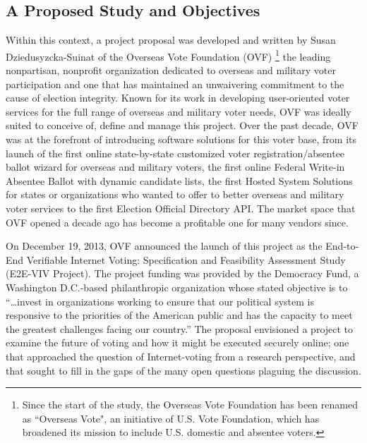\subsection{A Proposed Study and Objectives}
\label{sec:proposed-study-and-objectives}

Within this context, a project proposal was developed and written by
Susan Dziedusyzcka-Suinat of the Overseas Vote Foundation (OVF)
\footnote{Since the start of the study, the Overseas Vote Foundation
  has been renamed as ``Overseas Vote", an initiative of U.S. Vote
  Foundation, which has broadened its mission to include U.S. domestic
  and absentee voters.}  the leading nonpartisan, nonprofit
organization dedicated to overseas and military voter participation
and one that has maintained an unwaivering commitment to the cause of
election integrity. Known for its work in developing user-oriented
voter services for the full range of overseas and military voter
needs, OVF was ideally suited to conceive of, define and manage this
project. Over the past decade, OVF was at the forefront of introducing
software solutions for this voter base, from its launch of the first
online state-by-state customized voter registration/absentee ballot
wizard for overseas and military voters, the first online Federal
Write-in Absentee Ballot with dynamic candidate lists, the first
Hosted System Solutions for states or organizations who wanted to
offer to better overseas and military voter services to the first
Election Official Directory API. The market space that OVF opened a
decade ago has become a profitable one for many vendors since.

On December 19, 2013, OVF announced the launch of this project as the
End-to-End Verifiable Internet Voting: Specification and Feasibility
Assessment Study (E2E-VIV Project). The project funding was provided
by the Democracy Fund, a Washington D.C.-based philanthropic
organization whose stated objective is to ``\ldots{}invest in
organizations working to ensure that our political system is
responsive to the priorities of the American public and has the
capacity to meet the greatest challenges facing our country.'' The
proposal envisioned a project to examine the future of voting and how
it might be executed securely online; one that approached the question
of Internet-voting from a research perspective, and that sought to
fill in the gaps of the many open questions plaguing the discussion.

